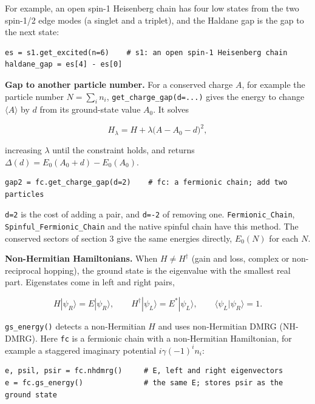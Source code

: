 \documentclass[11pt]{article}
\begin{document}
For example, an open spin-1 Heisenberg chain has four low states from the
two spin-1/2 edge modes (a singlet and a triplet), and the Haldane gap is
the gap to the next state:

\begin{lstlisting}
es = s1.get_excited(n=6)    # s1: an open spin-1 Heisenberg chain
haldane_gap = es[4] - es[0]
\end{lstlisting}

\textbf{Gap to another particle number.} For a conserved charge \(A\), for
example the particle number \(N=\sum_in_i\), \texttt{get\_\allowbreak{}charge\_\allowbreak{}gap(d=.\allowbreak{}.\allowbreak{}.\allowbreak{})} gives
the energy to change \(\langle A\rangle\) by \(d\) from its ground-state value
\(A_0\). It solves

\[H_\lambda=H+\lambda\big(A-A_0-d\big)^2,\]

increasing \(\lambda\) until the constraint holds, and returns
\(\Delta(d)=E_0(A_0+d)-E_0(A_0)\).

\begin{lstlisting}
gap2 = fc.get_charge_gap(d=2)    # fc: a fermionic chain; add two particles
\end{lstlisting}

\texttt{d=2} is the cost of adding a pair, and \texttt{d=-2} of removing one.
\texttt{Fermionic\_\allowbreak{}Chain}, \texttt{Spinful\_\allowbreak{}Fermionic\_\allowbreak{}Chain} and the native spinful chain
have this method. The conserved sectors of section 3 give the same energies
directly, \(E_0(N)\) for each \(N\).

\textbf{Non-Hermitian Hamiltonians.} When \(H\neq H^\dagger\) (gain and loss,
complex or non-reciprocal hopping), the ground state is the eigenvalue with
the smallest real part. Eigenstates come in left and right pairs,

\[H|\psi_R\rangle=E|\psi_R\rangle,\qquad
H^\dagger|\psi_L\rangle=E^*|\psi_L\rangle,\qquad
\langle\psi_L|\psi_R\rangle=1.\]

\texttt{gs\_\allowbreak{}energy()} detects a non-Hermitian \(H\) and uses non-Hermitian DMRG
(NH-DMRG). Here \texttt{fc} is a fermionic chain with a non-Hermitian Hamiltonian,
for example a staggered imaginary potential \(i\gamma(-1)^in_i\):

\begin{lstlisting}
e, psil, psir = fc.nhdmrg()     # E, left and right eigenvectors
e = fc.gs_energy()              # the same E; stores psir as the ground state
\end{lstlisting}
\end{document}
